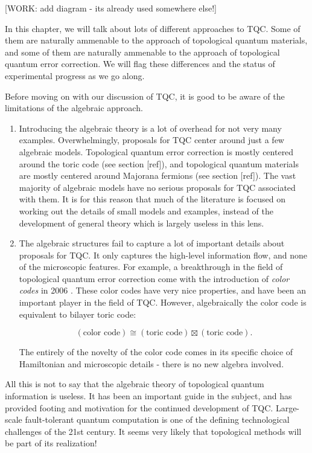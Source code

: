 [WORK: add diagram - its already used somewhere else!]

In this chapter, we will talk about lots of different approaches to TQC. Some of them are naturally ammenable to the approach of topological quantum materials, and some of them are naturally ammenable to the approach of topological quantum error correction. We will flag these differences and the status of experimental progress as we go along.

Before moving on with our discussion of TQC, it is good to be aware of the limitations of the algebraic approach.

\begin{enumerate}
\item Introducing the algebraic theory is a lot of overhead for not very many examples. Overwhelmingly, proposals for TQC center around just a few algebraic models. Topological quantum error correction is mostly centered around the toric code (see section [ref]), and topological quantum materials are mostly centered around Majorana fermions (see section [ref]). The vast majority of algebraic models have no serious proposals for TQC associated with them. It is for this reason that much of the literature is focused on working out the details of small models and examples, instead of the development of general theory which is largely useless in this lens.

\item The algebraic structures fail to capture a lot of important details about proposals for TQC. It only captures the high-level information flow, and none of the microscopic features. For example, a breakthrough in the field of topological quantum error correction come with the introduction of \textit{color codes} in 2006 \cite{bombin2006topological}. These color codes have very nice properties, and have been an important player in the field of TQC. However, algebraically the color code is equivalent to bilayer toric code:

$$(\text{color code})\cong (\text{toric code})\boxtimes (\text{toric code}).$$

The entirely of the novelty of the color code comes in its specific choice of Hamiltonian and microscopic details - there is no new algebra involved.

\end{enumerate}

All this is not to say that the algebraic theory of topological quantum information is useless. It has been an important guide in the subject, and has provided footing and motivation for the continued development of TQC. Large-scale fault-tolerant quantum computation is one of the defining technological challenges of the 21st century. It seems very likely that topological methods will be part of its realization!

